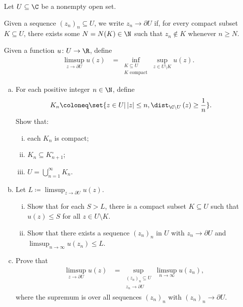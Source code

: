 \documentclass[10pt]{mypackage}
\begin{document}
\RaggedRight
\begin{problem}[Problem 1]
  Let $U\subseteq \C$ be a nonempty open set.\newline

  Given a sequence $\left( z_n \right)_n\subseteq U$, we write $z_n\rightarrow \partial U$ if, for every compact subset $K\subseteq U$, there exists some $N = N(K)\in \N$ such that $z_n\notin K$ whenever $n\geq N$.\newline

  Given a function $u\colon U\rightarrow \R$, define
  \begin{align*}
    \limsup_{z\rightarrow \partial U} u(z) &= \inf_{\substack{K\subseteq U\\K\text{ compact}}} \sup_{z\in U\setminus K} u(z).
  \end{align*}
  \begin{enumerate}[(a)]
    \item For each positive integer $n\in\N$, define
      \begin{align*}
        K_n &\coloneq \set{z\in U | \left\vert z \right\vert \leq n, \dist_{\C\setminus U}\left( z \right) \geq \frac{1}{n}}.
      \end{align*}
      Show that:
      \begin{enumerate}[(i)]
        \item each $K_n$ is compact;
        \item $K_n\subseteq K_{n+1}^{\circ}$;
        \item $U = \bigcup_{n=1}^{\infty}K_n$.
      \end{enumerate}
    \item Let $L \coloneq \limsup_{z\rightarrow \partial U} u(z)$.
      \begin{enumerate}[(i)]
        \item Show that for each $S > L$, there is a compact subset $K\subseteq U$ such that $u(z)\leq S$ for all $z\in U\setminus K$.
        \item Show that there exists a sequence $\left( z_n \right)_n$ in $U$ with $z_n\rightarrow \partial U$ and $\limsup_{n\rightarrow\infty}u\left( z_n \right)\leq L$.
      \end{enumerate}
    \item Prove that
      \begin{align*}
        \limsup_{z\rightarrow \partial U} u(z) &= \sup_{\substack{\left( z_n \right)_n\subseteq U\\z_n\rightarrow \partial U}}\limsup_{n\rightarrow\infty} u\left( z_n \right),
      \end{align*}
      where the supremum is over all sequences $\left( z_n \right)_n$ with $\left( z_n \right)_n\rightarrow \partial U$.
  \end{enumerate}
\end{problem}
\end{document}
